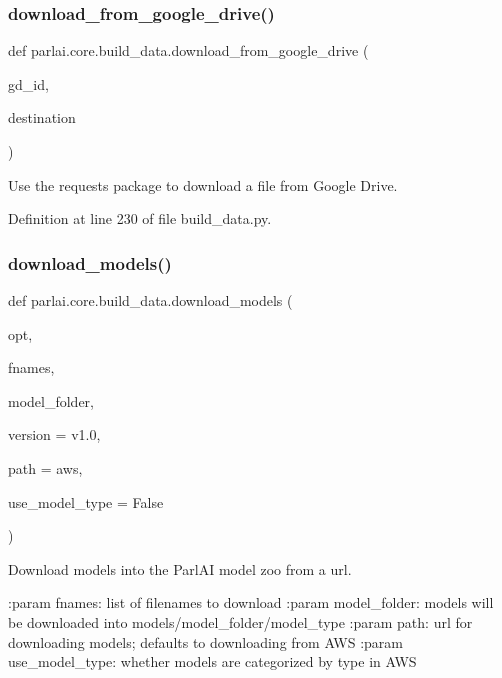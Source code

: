 \subsubsection{\texorpdfstring{download\+\_\+from\+\_\+google\+\_\+drive()}{download\_from\_google\_drive()}}
{\footnotesize\ttfamily def parlai.\+core.\+build\+\_\+data.\+download\+\_\+from\+\_\+google\+\_\+drive (\begin{DoxyParamCaption}\item[{}]{gd\+\_\+id,  }\item[{}]{destination }\end{DoxyParamCaption})}

\begin{DoxyVerb}Use the requests package to download a file from Google Drive.\end{DoxyVerb}
 

Definition at line 230 of file build\+\_\+data.\+py.

\mbox{\label{namespaceparlai_1_1core_1_1build__data_ab697f23f05d3e36d7979fe5e0ed7911e}} 
\subsubsection{\texorpdfstring{download\+\_\+models()}{download\_models()}}
{\footnotesize\ttfamily def parlai.\+core.\+build\+\_\+data.\+download\+\_\+models (\begin{DoxyParamCaption}\item[{}]{opt,  }\item[{}]{fnames,  }\item[{}]{model\+\_\+folder,  }\item[{}]{version = {\ttfamily \textquotesingle{}v1.0\textquotesingle{}},  }\item[{}]{path = {\ttfamily \textquotesingle{}aws\textquotesingle{}},  }\item[{}]{use\+\_\+model\+\_\+type = {\ttfamily False} }\end{DoxyParamCaption})}

\begin{DoxyVerb}Download models into the ParlAI model zoo from a url.

:param fnames: list of filenames to download
:param model_folder: models will be downloaded into models/model_folder/model_type
:param path: url for downloading models; defaults to downloading from AWS
:param use_model_type: whether models are categorized by type in AWS
\end{DoxyVerb}
 

